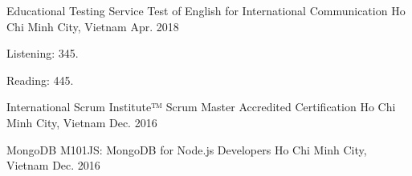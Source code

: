 \begin{cventries}

\cventry
{Educational Testing Service}
{Test of English for International Communication}
{Ho Chi Minh City, Vietnam}
{Apr. 2018}
{
\begin{cvitems}
\item {Listening: 345.}
\item {Reading: 445.}
\end{cvitems}
}


\cventry
{International Scrum Institute™}
{Scrum Master Accredited Certification}
{Ho Chi Minh City, Vietnam}
{Dec. 2016}
{
\begin{cvitems}
\end{cvitems}
}


\cventry
{MongoDB}
{M101JS: MongoDB for Node.js Developers}
{Ho Chi Minh City, Vietnam}
{Dec. 2016}
{
\begin{cvitems}
\end{cvitems} 
}


\end{cventries}